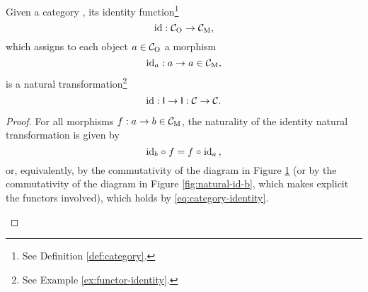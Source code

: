 \begin{example}
  \label{ex:natural-identity}

  Given a category , its identity function\footnote{See
    Definition \ref{def:category}.}
  \begin{equation*}
    \operatorname{id}: \mathcal{C}_{\operatorname{O}} \to \mathcal{C}_{\operatorname{M}}
    \text{,}
  \end{equation*}
  which assigns to each object $a \in \mathcal{C}_{\operatorname{O}}$ a morphism
  \begin{equation*}
    \operatorname{id}_{a}: a \to a \in \mathcal{C}_{\operatorname{M}}
    \text{,}
  \end{equation*}
  is a natural transformation\footnote{See Example
    \ref{ex:functor-identity}.}
  \begin{equation*}
    \operatorname{id}: \mathsf{I} \to \mathsf{I}: \mathcal{C} \to \mathcal{C}
    \text{.}
  \end{equation*}

  \begin{proof}

    For all morphisms $f: a \to b \in \mathcal{C}_{\operatorname{M}}$, the naturality of the
    identity natural transformation is given by
    \begin{equation*}
      \operatorname{id}_{b} \mathrel{\circ} f = f \mathrel{\circ} \operatorname{id}_{a}
      \text{,}
    \end{equation*}
    or, equivalently, by the commutativity of the diagram in Figure
    \ref{fig:natural-id-a} (or by the commutativity of the diagram in
    Figure \ref{fig:natural-id-b}, which makes explicit the functors
    involved), which holds by \eqref{eq:category-identity}.

    \begin{figure}[htbp]
      \begin{subfigure}[b]{0.5\linewidth}
        \begin{center}
        \end{center}
        \caption{}
        \label{fig:natural-id-a}
      \end{subfigure}
      \begin{subfigure}[b]{0.5\linewidth}
        \begin{center}
\end{center}
\end{subfigure}
\end{figure}
\end{proof}
\end{example}
